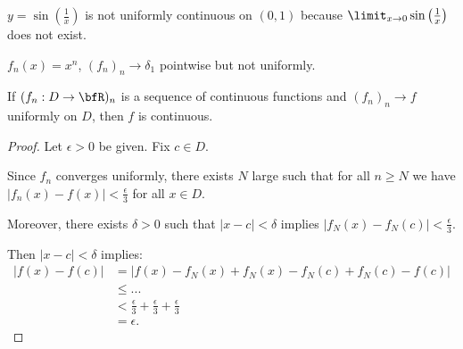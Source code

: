     \begin{example}
        $y = \sin \left(\frac{1}{x}\right)$ is not uniformly continuous on $(0,1)$ because $\limit_{x \rightarrow 0}\sin \left(\frac{1}{x}\right)$ does not exist.
    \end{example}

    \begin{recall}
        $f_n(x) = x^n$, $(f_n)_n \rightarrow \delta_1$ pointwise but not uniformly. 
    \end{recall}

    \begin{proposition}
        If $(f_n:D \rightarrow \bfR)_n$ is a sequence of continuous functions and $(f_n)_n \rightarrow f$ uniformly on $D$, then $f$ is continuous.
    \end{proposition}
        \begin{proof}
            Let $\epsilon > 0$ be given. Fix $c \in D$. \nl
            
            Since $f_n$ converges uniformly, there exists $N$ large such that for all $n \geq N$ we have $|f_n(x) - f(x)| < \frac{\epsilon}{3}$ for all $x \in D$. \nl
            
            Moreover, there exists $\delta > 0$ such that $|x-c| < \delta$ implies $|f_N(x) - f_N(c)| < \frac{\epsilon}{3}$. \nl
            
            Then $|x-c| < \delta$ implies:
                \begin{equation*}
                \begin{split}
                    |f(x) - f(c)|
                    & = |f(x) - f_N(x) + f_N(x) - f_N(c) + f_N(c) - f(c)| \\
                    & \leq ... \\
                    & < \frac{\epsilon}{3} + \frac{\epsilon}{3} + \frac{\epsilon}{3} \\
                    & = \epsilon.
                \end{split}
                \end{equation*}
        \end{proof}

